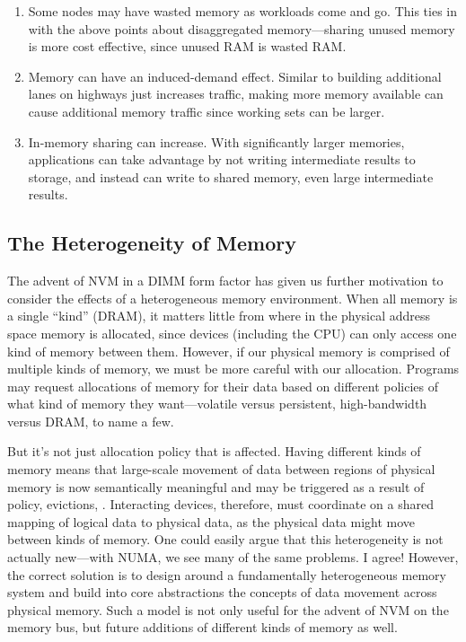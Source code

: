 \begin{enumerate}
    \item Some nodes may have wasted memory as workloads come and go. This ties in with the above points about
          disaggregated memory---sharing unused memory is more cost effective, since unused RAM is wasted RAM.
    \item Memory can have an induced-demand effect. Similar to building additional lanes on highways just increases
          traffic, making more memory available can cause additional memory traffic since working sets can be larger.
    \item In-memory sharing can increase. With significantly larger memories, applications can take advantage by not
          writing intermediate results to storage, and instead can write to shared memory, even large intermediate results.
\end{enumerate}

\subsection{The Heterogeneity of Memory}

The advent of NVM in a DIMM form factor has given us further motivation to consider the effects of a heterogeneous
memory environment. When all memory is a single ``kind'' (\eg DRAM), it matters little from where in the physical
address space memory is allocated, since devices (including the CPU) can only access one kind of memory between
them. However, if our physical memory is comprised of multiple kinds of memory, we must be more careful with
our allocation. Programs may request allocations of memory for their data based on different policies of what kind of
memory they want---volatile versus persistent, high-bandwidth versus DRAM, to name a few.

But it's not just allocation policy that is affected. Having different kinds of memory means that large-scale movement
of data between regions of physical memory is now semantically meaningful and may be triggered as a result of policy,
evictions, \etc. Interacting devices, therefore, must coordinate on a shared mapping of logical data to physical data,
as the physical data might move between kinds of memory. One could easily argue that this heterogeneity is not actually
new---with NUMA, we see many of the same problems. I agree! However, the correct solution is to design around a
fundamentally heterogeneous memory system and build into core abstractions the concepts of data movement across physical
memory. Such a model is not only useful for the advent of NVM on the memory bus, but future additions of different kinds
of memory as well.

